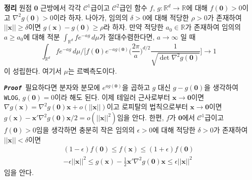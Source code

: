 \documentclass[10pt,onecolumn,twoside,a4size]{gsag3jnl}
\newcommand{\proof}{\texttt{\textit{\textbf{Proof }}}}
\begin{document}
\noindent\textsf{\textbf{정리} 원점 $\mathbf{0}$ 근방에서 각각 $\mathcal{C}^1$급이고 $\mathcal{C}^2$급인 함수 $f,\,g:\mathbb{R}^d\to\mathbb{R}$에 대해 $f(\mathbf{0})>0$이고 $\nabla^2g(\mathbf{0})>0$이라 하자. 나아가, 임의의 $\delta>0$에 대해 적당한 $\rho>0$가 존재하여 $||\mathbf{x}||\geq\delta$이면 $g(\mathbf{x})-g(\mathbf{0})\geq\rho$라 하자. 만약 적당한 $a_0\in\mathbb{R}$가 존재하여 임의의 $a\geq a_0$에 대해 적분 $\int_{\mathbb{R}^d}fe^{-ag}\,d\mu$가 절대수렴한다면, $a\to\infty$ 일 때
\begin{equation}
  \int_{\mathbb{R}^d}fe^{-ag}\,d\mu\bigg/\bigg[f(\mathbf{0})e^{-ag(\mathbf{0})}\bigg(\frac{2\pi}{a}\bigg)^{d/2}\frac{1}{\sqrt{\det\nabla^2g(\mathbf{0})}}\bigg]\to1
\end{equation}
이 성립한다. 여기서 $\mu$는 르벡측도이다.}

\proof 필요하다면 분자와 분모에 $e^{ag(\mathbf{0})}$을 곱하고 $g$ 대신 $g-g(\mathbf{0})$을 생각하여 \texttt{WLOG}, $g(\mathbf{0})=0$이라 해도 된다. 이제 테일러 근사로부터 $\mathbf{x}\to\mathbf{0}$이면 $\nabla g(\mathbf{x})=\nabla^2g(\mathbf{0})\mathbf{x}+o(||\mathbf{x}||)$이고 로피탈의 법칙으로부터 $\mathbf{x}\to\mathbf{0}$이면 $g(\mathbf{x})-\mathbf{x}'\nabla^2g(\mathbf{0})\mathbf{x}/2=o(||\mathbf{x}||^2)$임을 안다. 한편, $f$가 $\mathbf{0}$에서 $\mathcal{C}^1$급이고 $f(\mathbf{0})>0$임을 생각하면 충분히 작은 임의의 $\epsilon>0$에 대해 적당한 $\delta>0$가 존재하여 $||\mathbf{x}||<\delta$이면
\begin{align}
  (1-\epsilon)f(\mathbf{0})\leq f(\mathbf{x})\leq(1+\epsilon)f(\mathbf{0})\\
  -\epsilon||\mathbf{x}||^2\leq g(\mathbf{x})-\frac{1}{2}\mathbf{x}'\nabla^2g(\mathbf{0})\mathbf{x}\leq \epsilon ||\mathbf{x}||^2
\end{align}
임을 안다.
\end{document}
